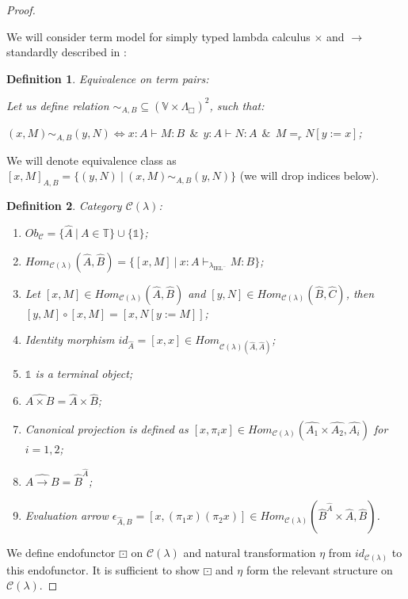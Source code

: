 \documentclass[a4paper]{article}
\newtheorem{defin}{Definition}
\begin{document}
\begin{proof}

$ $

We will consider term model for simply typed lambda calculus $\times$ and $\to$ standardly described in \cite{LambekScott}:

\begin{defin} Equivalence on term pairs:
  $ $

  Let us define relation $\sim_{A, B} \subseteq (\mathbb{V} \times \Lambda_{\Box})^2$, such that:

  $(x, M) \sim_{A, B} (y, N) \Leftrightarrow x : A \vdash M : B \:\: \& \:\: y : A \vdash N : A \:\: \& \:\: M =_r N [y := x]$;
\end{defin}

We will denote equivalence class as $[x, M]_{A, B} = \{ (y, N) \: | \: (x, M) \sim_{A, B} (y, N) \}$ (we will drop indices below).


\begin{defin} Category $\mathcal{C}(\lambda)$:
\begin{enumerate}
  \item $Ob_{\mathcal{C}} = \{ \hat{A} \: | \: A \in \mathbb{T} \} \cup \{ \mathds{1} \}$;
  \item $Hom_{\mathcal{C}(\lambda)}(\hat{A},\hat{B}) = \{ [x, M] \: | \: x : A \vdash_{\lambda_{\text{IEL}^{-}}} M : B \}$;
  \item Let $[x, M] \in Hom_{\mathcal{C}(\lambda)}(\hat{A},\hat{B})$ and $[y,N] \in Hom_{\mathcal{C}(\lambda)}(\hat{B},\hat{C})$, then $[y,M] \circ [x, M] = [x, N [y := M]]$;
  \item Identity morphism $id_{\hat{A}} = [x,x] \in Hom_{\mathcal{C}(\lambda)(\hat{A}, \hat{A})}$;
  \item $\mathds{1}$ is a terminal object;
  \item $\widehat{A \times B} = \hat{A} \times \hat{B}$;
  \item Canonical projection is defined as $[x, \pi_i x] \in Hom_{\mathcal{C}(\lambda)}(\hat{A_1} \times \hat{A_2},\hat{A_i})$ for $i = 1, 2$;
  \item $\widehat{A \to B} = \hat{B}^{\hat{A}}$;
  \item Evaluation arrow $\epsilon_{\hat{A},\hat{B}} = [x, (\pi_1 x) (\pi_2 x)] \in Hom_{\mathcal{C}(\lambda)}(\hat{B}^{\hat{A}} \times \hat{A}, \hat{B})$.
\end{enumerate}
\end{defin}

We define endofunctor $\boxdot$ on $\mathcal{C}(\lambda)$ and natural transformation $\eta$ from $id_{\mathcal{C}(\lambda)}$ to this endofunctor.
It is sufficient to show $\boxdot$ and $\eta$ form the relevant structure on $\mathcal{C}(\lambda)$.


\end{proof}
\end{document}
